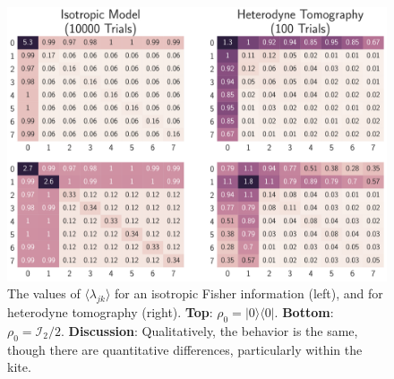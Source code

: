 \documentclass[aps,pra, twocolumn]{revtex4-1}
\begin{document}
 
\begin{figure}
  \includegraphics[width=\columnwidth]{Images/Figure_10.pdf}
 \caption{The values of $\langle \lambda_{jk} \rangle$ for an isotropic Fisher information (left), and for heterodyne tomography (right). \textbf{Top}: $\rho_{0} = |0\rangle\langle 0|$. \textbf{Bottom}: $\rho_{0} = \mathcal{I}_{2}/2$. \textbf{Discussion}: Qualitatively, the behavior is the same, though there are quantitative differences, particularly within the kite.}
\label{fig:model_comparison}
\end{figure}
\end{document}
